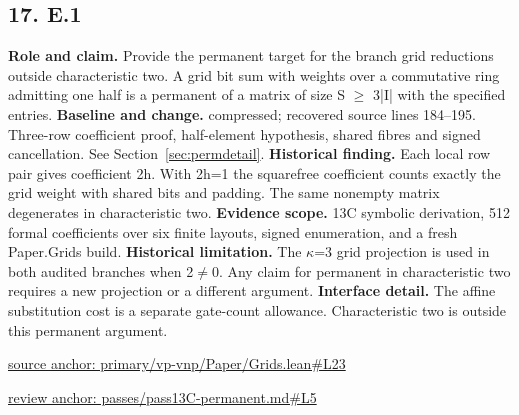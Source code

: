 \documentclass[11pt,letterpaper]{article}
\theoremstyle{definition}\newtheorem{definition}[theorem]{Definition}\newtheorem{example}[theorem]{Example}
\theoremstyle{remark}\newtheorem{remark}[theorem]{Remark}
\begin{document}
\subsection*{17. E.1}
\textbf{Role and claim.} Provide the permanent target for the branch grid reductions outside characteristic two. A grid bit sum with weights over a commutative ring admitting one half is a permanent of a matrix of size S \ensuremath{\ge} 3|I| with the specified entries.
\textbf{Baseline and change.} compressed; recovered source lines 184--195. Three-row coefficient proof, half-element hypothesis, shared fibres and signed cancellation. See Section~\ref{sec:permdetail}.
\textbf{Historical finding.} Each local row pair gives coefficient 2h. With 2h=1 the squarefree coefficient counts exactly the grid weight with shared bits and padding. The same nonempty matrix degenerates in characteristic two.
\textbf{Evidence scope.} 13C symbolic derivation, 512 formal coefficients over six finite layouts, signed enumeration, and a fresh Paper.Grids build.
\textbf{Historical limitation.} The \ensuremath{\kappa}=3 grid projection is used in both audited branches when 2\ensuremath{\ne}0. Any claim for permanent in characteristic two requires a new projection or a different argument.
\textbf{Interface detail.} The affine substitution cost is a separate gate-count allowance. Characteristic two is outside this permanent argument.
\par\href{https://github.com/nousentllc/VP-VNP-Review/blob/8a7976933b6b2b4ffda1ad3a0dfb5fc6b6f023e8/primary/vp-vnp/Paper/Grids.lean\#L23}{source anchor: primary/vp-vnp/Paper/Grids.lean\#L23}
\par\href{https://github.com/nousentllc/VP-VNP-Review/blob/8a7976933b6b2b4ffda1ad3a0dfb5fc6b6f023e8/passes/pass13C-permanent.md\#L5}{review anchor: passes/pass13C-permanent.md\#L5}
\goodbreak
\end{document}
